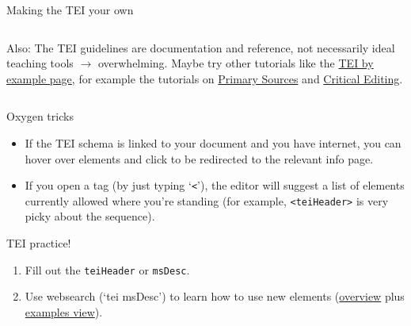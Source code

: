 \begin{frame}{Making the TEI your own}
\begin{columns}
\begin{block}{}
Also: The TEI guidelines are documentation and reference, not necessarily ideal teaching tools $\to$ overwhelming. Maybe try other tutorials like the \href{https://teibyexample.org/tutorials/TBED00v00.htm}{TEI by example page}, for example the tutorials on \alert{\href{https://teibyexample.org/tutorials/TBED06v00.htm}{Primary Sources}} and \alert{\href{https://teibyexample.org/tutorials/TBED07v00.htm}{Critical Editing}}.
\end{block}

\end{columns}

\begin{block}{Oxygen tricks}
\begin{itemize}\normalsize
    \item If the TEI schema is linked to your document and you have internet, you can hover over elements and click to be redirected to the relevant info page. 
    \item If you open a tag (by just typing `\texttt{<}'), the editor will suggest a list of elements currently allowed where you're standing (for example, \texttt{<teiHeader>} is very picky about the sequence).
\end{itemize}
\end{block}

\end{frame}

\begin{frame}[standout]
    \alert{TEI practice!} \\
    \begin{enumerate}\small
        \item Fill out the \texttt{teiHeader} or \texttt{msDesc}.
        \item Use websearch (`tei msDesc') to learn how to use new elements (\href{https://tei-c.org/release/doc/tei-p5-doc/en/html/ref-msDesc.html}{overview} plus \href{https://tei-c.org/release/doc/tei-p5-doc/en/html/examples-msDesc.html}{examples view}).
    \end{enumerate} 
\end{frame}




